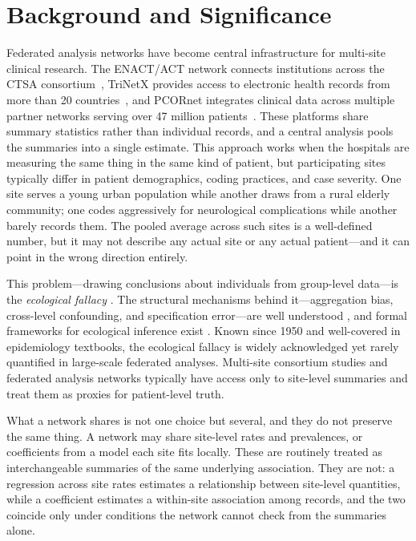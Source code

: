 \documentclass[11pt]{article}
\begin{document}
\section{Background and Significance}

Federated analysis networks have become central infrastructure for
multi-site clinical research.  The ENACT/ACT network connects
institutions across the CTSA consortium~\cite{visweswaran2018act},
TriNetX provides access to electronic health records from more than
20 countries~\cite{trinetx2024}, and PCORnet integrates clinical
data across multiple partner networks serving over 47 million
patients~\cite{fleurence2014pcornet}.  These
platforms share summary statistics rather than individual records,
and a central analysis pools the summaries into a single estimate.
This approach works when the hospitals are measuring the same thing
in the same kind of patient, but participating sites typically differ
in patient demographics, coding practices, and case severity.
One site serves a young urban population while another draws from
a rural elderly community; one codes aggressively for neurological
complications while another barely records them.  The pooled average
across such sites is a well-defined number, but it may not describe
any actual site or any actual patient---and it can point in the wrong
direction entirely.

This problem---drawing conclusions about individuals from group-level
data---is the \emph{ecological fallacy}
\cite{robinson1950ecological}.  The structural mechanisms behind it---aggregation
bias, cross-level confounding, and specification error---are well understood
\cite{greenland1992ecological,greenland2001ecologic}, and formal frameworks
for ecological inference exist \cite{king1997ecological,wakefield2003ecological,wakefield2008ecologic}.
Known since 1950 and well-covered in epidemiology textbooks, the
ecological fallacy is widely acknowledged yet rarely quantified in
large-scale federated analyses.
Multi-site consortium studies and federated analysis networks typically have
access only to site-level summaries and treat them as proxies for
patient-level truth.

What a network shares is not one choice but several, and they do not
preserve the same thing.  A network may share site-level rates and
prevalences, or coefficients from a model each site fits locally.  These are
routinely treated as interchangeable summaries of the same underlying
association.  They are not: a regression across site rates estimates a
relationship between site-level quantities, while a coefficient
estimates a within-site association among records, and the two coincide
only under conditions the network cannot check from the summaries alone.
\end{document}
